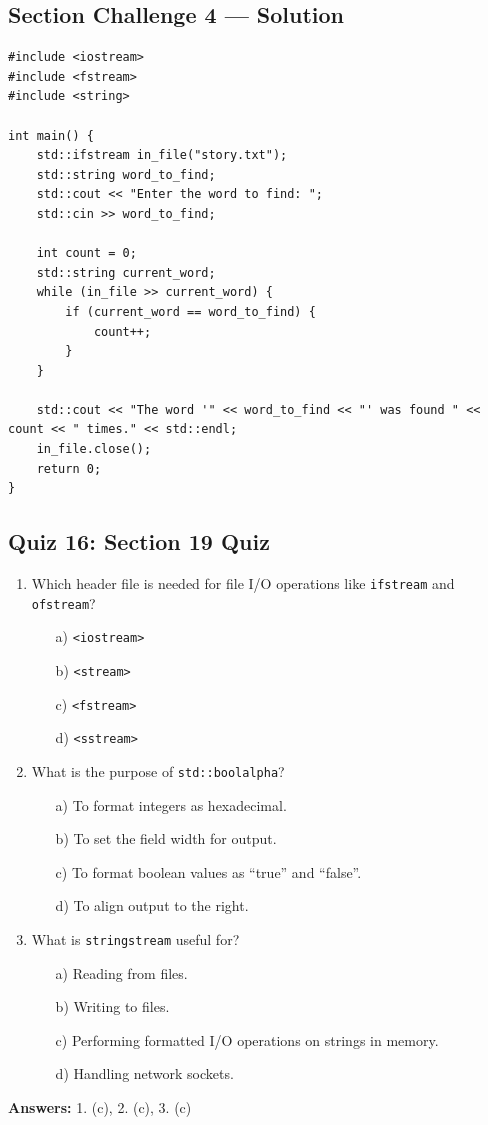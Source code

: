 \subsection{Section Challenge 4 --- Solution}
\begin{lstlisting}
#include <iostream>
#include <fstream>
#include <string>

int main() {
	std::ifstream in_file("story.txt");
	std::string word_to_find;
	std::cout << "Enter the word to find: ";
	std::cin >> word_to_find;

	int count = 0;
	std::string current_word;
	while (in_file >> current_word) {
		if (current_word == word_to_find) {
			count++;
		}
	}

	std::cout << "The word '" << word_to_find << "' was found " << count << " times." << std::endl;
	in_file.close();
	return 0;
}
\end{lstlisting}

\subsection{Quiz 16: Section 19 Quiz}
\begin{enumerate}
    \item Which header file is needed for file I/O operations like \texttt{ifstream} and \texttt{ofstream}?
    \begin{enumerate}
        \item[a)] \texttt{<iostream>}
        \item[b)] \texttt{<stream>}
        \item[c)] \texttt{<fstream>}
        \item[d)] \texttt{<sstream>}
    \end{enumerate}

    \item What is the purpose of \texttt{std::boolalpha}?
    \begin{enumerate}
        \item[a)] To format integers as hexadecimal.
        \item[b)] To set the field width for output.
        \item[c)] To format boolean values as ``true'' and ``false''.
        \item[d)] To align output to the right.
    \end{enumerate}

    \item What is \texttt{stringstream} useful for?
    \begin{enumerate}
        \item[a)] Reading from files.
        \item[b)] Writing to files.
        \item[c)] Performing formatted I/O operations on strings in memory.
        \item[d)] Handling network sockets.
    \end{enumerate}
\end{enumerate}

\textbf{Answers:} 1. (c), 2. (c), 3. (c)
